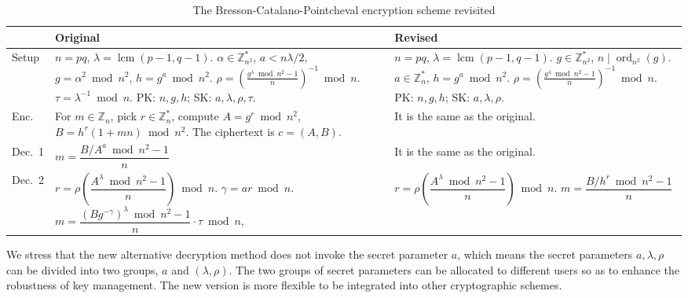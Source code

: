 \documentclass[11pt,a4paper]{article}
\theoremstyle{remark}
\newcommand{\Z}{\mathbb{Z}}
\newcommand{\ord}{\operatorname{ord}}
\newcommand{\lcm}{\operatorname{lcm}}
\begin{document}
\begin{table}[h]
\centering
\caption{The Bresson-Catalano-Pointcheval encryption scheme revisited}
\renewcommand{\arraystretch}{1.3}
\begin{tabular}{@{}l p{} p{}@{}}
\toprule
 & \textbf{Original} & \textbf{Revised}\\
\midrule
Setup &
$n=pq$, $\lambda=\lcm(p-1,q-1)$.\newline
$\alpha\in\Z_{n^2}^*$, $a<n\lambda/2$,\newline
$g=\alpha^2 \bmod n^2$, $h=g^a \bmod n^2$.\newline
$\rho=\left(\frac{g^\lambda \bmod n^2 - 1}{n}\right)^{-1} \bmod n$.\newline
$\tau=\lambda^{-1} \bmod n$.\newline
PK: $n,g,h$; SK: $a,\lambda,\rho,\tau$.
&
$n=pq$, $\lambda=\lcm(p-1,q-1)$.\newline
$g\in\Z_{n^2}^*$, $n\mid\ord_{n^2}(g)$.\newline
$a\in\Z_n^*$, $h=g^a \bmod n^2$.\newline
$\rho=\left(\frac{g^\lambda \bmod n^2 - 1}{n}\right)^{-1} \bmod n$.\newline
PK: $n,g,h$; SK: $a,\lambda,\rho$.\\
\midrule
Enc. &
For $m\in\Z_n$, pick $r\in\Z_n^*$, compute $A=g^r \bmod n^2$, $B=h^r(1+mn) \bmod n^2$. The ciphertext is $c=(A,B)$.
& It is the same as the original.\\
\midrule
Dec.~1 &
$m = \dfrac{B/A^a \bmod n^2 - 1}{n}$
& It is the same as the original.\\
\midrule
Dec.~2 &
$r=\rho\left(\dfrac{A^\lambda \bmod n^2 - 1}{n}\right) \bmod n$.\newline
$\gamma = ar \bmod n$.\newline
$m = \dfrac{(Bg^{-\gamma})^\lambda \bmod n^2 - 1}{n}\cdot\tau \bmod n$,
&
$r=\rho\left(\dfrac{A^\lambda \bmod n^2 - 1}{n}\right) \bmod n$.\newline
$m = \dfrac{B/h^r \bmod n^2 - 1}{n}$\\
\bottomrule
\end{tabular}
\end{table}

We stress that the new alternative decryption method does not invoke the secret parameter $a$, which means the secret parameters $a,\lambda,\rho$ can be divided into two groups, $a$ and $(\lambda,\rho)$. The two groups of secret parameters can be allocated to different users so as to enhance the robustness of key management. The new version is more flexible to be integrated into other cryptographic schemes.
\end{document}
